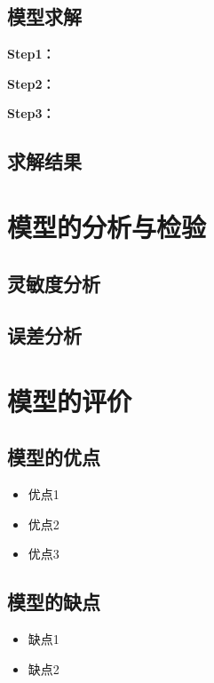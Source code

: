 \documentclass{cumcmthesis}
\begin{document}
\subsection{模型求解}

\textbf{Step1：} 

\textbf{Step2：} 

\textbf{Step3：} 

\subsection{求解结果}



\section{模型的分析与检验}

\subsection{灵敏度分析}

\subsection{误差分析}


\section{模型的评价}

\subsection{模型的优点}
\begin{itemize}[itemindent=2em]
\item 优点1
\item 优点2
\item 优点3
\end{itemize}

\subsection{模型的缺点}
\begin{itemize}[itemindent=2em]
\item 缺点1
\item 缺点2
\end{itemize}
\end{document}
